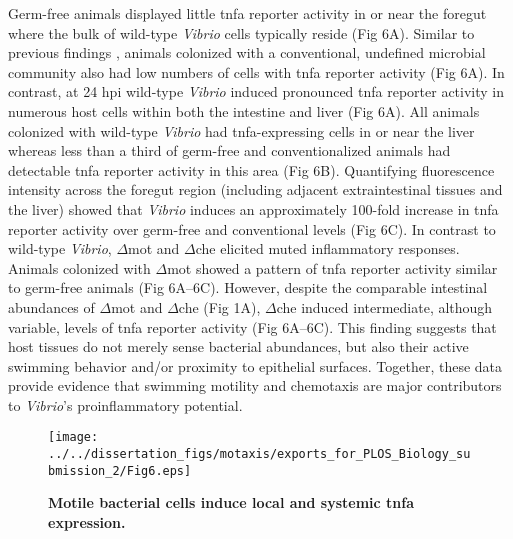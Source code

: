 Germ-free animals displayed little tnfa reporter activity in or near the foregut where the bulk of wild-type \textit{Vibrio} cells typically reside (Fig 6A). Similar to previous findings \cite{marjoram_epigenetic_2015}, animals colonized with a conventional, undefined microbial community also had low numbers of cells with tnfa reporter activity (Fig 6A). In contrast, at 24 hpi wild-type \textit{Vibrio} induced pronounced tnfa reporter activity in numerous host cells within both the intestine and liver (Fig 6A). All animals colonized with wild-type \textit{Vibrio} had tnfa-expressing cells in or near the liver whereas less than a third of germ-free and conventionalized animals had detectable tnfa reporter activity in this area (Fig 6B). Quantifying fluorescence intensity across the foregut region (including adjacent extraintestinal tissues and the liver) showed that \textit{Vibrio} induces an approximately 100-fold increase in tnfa reporter activity over germ-free and conventional levels (Fig 6C). In contrast to wild-type \textit{Vibrio}, $\Delta$mot and $\Delta$che elicited muted inflammatory responses. Animals colonized with $\Delta$mot showed a pattern of tnfa reporter activity similar to germ-free animals (Fig 6A–6C). However, despite the comparable intestinal abundances of $\Delta$mot and $\Delta$che (Fig 1A), $\Delta$che induced intermediate, although variable, levels of tnfa reporter activity (Fig 6A–6C). This finding suggests that host tissues do not merely sense bacterial abundances, but also their active swimming behavior and/or proximity to epithelial surfaces. Together, these data provide evidence that swimming motility and chemotaxis are major contributors to \textit{Vibrio}'s proinflammatory potential. 

\begin{figure}[h!]
	\centerline{
		\texttt{[image: ../../dissertation\_figs/motaxis/exports\_for\_PLOS\_Biology\_submission\_2/Fig6.eps]}}
	\caption{\textbf{Motile bacterial cells induce local and systemic tnfa expression.}}
\end{figure}


